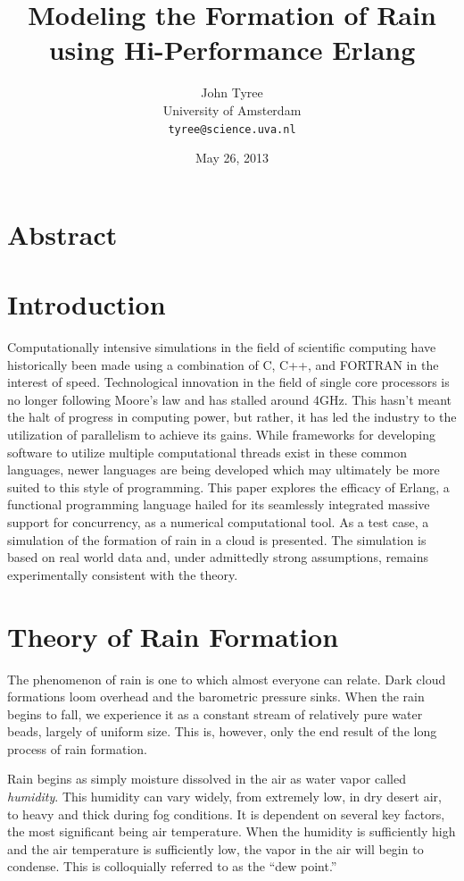 \documentclass[twocolumn,a4paper,10pt]{article}
\title{Modeling the Formation of Rain using Hi-Performance Erlang}
\author{John Tyree\\
University of Amsterdam\\
\texttt{tyree@science.uva.nl}}
\date{May 26, 2013}
\begin{document}
\maketitle
\section{Abstract}
\section{Introduction}

Computationally intensive simulations in the field of scientific computing have
historically been made using a combination of C, C++, and FORTRAN in the
interest of speed. Technological innovation in the field of single core
processors is no longer following Moore's law and has stalled around 4GHz. This
hasn't meant the halt of progress in computing power, but rather, it has led the
industry to the utilization of parallelism to achieve its gains. While
frameworks for developing software to utilize multiple computational threads
exist in these common languages, newer languages are being developed which may
ultimately be more suited to this style of programming. This paper explores the
efficacy of Erlang, a functional programming language hailed for its seamlessly
integrated massive support for concurrency, as a numerical computational tool.
As a test case, a simulation of the formation of rain in a cloud is presented.
The simulation is based on real world data and, under admittedly strong
assumptions, remains experimentally consistent with the theory.

\section{Theory of Rain Formation}

The phenomenon of rain is one to which almost everyone can relate. Dark cloud
formations loom overhead and the barometric pressure sinks. When the rain begins
to fall, we experience it as a constant stream of relatively pure water beads,
largely of uniform size. This is, however, only the end result of the long process of
rain formation.

Rain begins as simply moisture dissolved in the air as water vapor called
\emph{humidity}.  This humidity can vary widely, from extremely low, in dry
desert air, to heavy and thick during fog conditions. It is dependent on several
key factors, the most significant being air temperature\citet{hu1998}. When the
humidity is sufficiently high and the air temperature is sufficiently low, the
vapor in the air will begin to condense. This is colloquially referred to as the
``dew point.''
\end{document}
